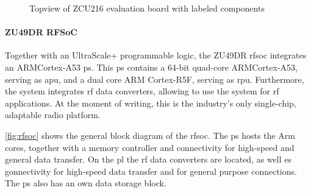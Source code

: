 \begin{figure}[tb]
{}
	\caption{Topview of ZCU216 evaluation board with labeled components \cite{zcu216}}
	\label{fig:zcu216}
\end{figure}

\paragraph{ZU49DR RFSoC}
Together with an UltraScale+ programmable logic, the ZU49DR \gls{rfsoc} integrates an ARM\textregistered Cortex\texttrademark-A53 \gls{ps}.
This \gls{ps} contains a 64-bit quad-core ARM\textregistered Cortex\texttrademark-A53, serving as \gls{apu}, and a dual core ARM Cortex-R5F, serving as \gls{rpu}.
Furthermore, the system integrates \gls{rf} data converters, allowing to use the system for \gls{rf} applications.
At the moment of writing, this is the industry's only single-chip, adaptable radio platform. \cite{zu49}

\autoref{fig:rfsoc} shows the general block diagram of the \gls{rfsoc}.
The \gls{ps} hosts the Arm cores, together with a memory controller and connectivity for high-speed and general data transfer.
On the \gls{pl} the \gls{rf} data converters are located, as well es gonnectivity for high-speed data transfer and for general purpose connections. 
The \gls{ps} also has an own data storage block.


